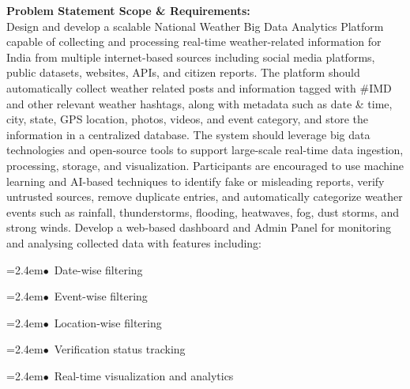 \documentclass[10pt,a4paper]{article}
\begin{document}
\begin{tcolorbox}[pscard, title={"\textbf{SIH26069} \quad $\vert$ \quad National Weather Big Data Analytics Platform}]
\textbf{\color{sihnavy}Problem Statement Scope \& Requirements:}\\[0.15cm]
\noindent\small Design and develop a scalable National Weather Big Data Analytics Platform capable of collecting and processing real-time weather-related information for India from multiple internet-based sources including social media platforms, public datasets, websites, APIs, and citizen reports. The platform should automatically collect weather related posts and information tagged with \#IMD and other relevant weather hashtags, along with metadata such as date \& time, city, state, GPS location, photos, videos, and event category, and store the information in a centralized database. The system should leverage big data technologies and open-source tools to support large-scale real-time data ingestion, processing, storage, and visualization. Participants are encouraged to use machine learning and AI-based techniques to identify fake or misleading reports, verify untrusted sources, remove duplicate entries, and automatically categorize weather events such as rainfall, thunderstorms, flooding, heatwaves, fog, dust storms, and strong winds. Develop a web-based dashboard and Admin Panel for monitoring and analysing collected data with features including:\par\vspace{0.06cm}
\noindent\hspace*{1.2em}\hangindent=2.4em\textcolor{sihblue}{$\bullet$}~\small Date-wise filtering\par\vspace{0.05cm}
\noindent\hspace*{1.2em}\hangindent=2.4em\textcolor{sihblue}{$\bullet$}~\small Event-wise filtering\par\vspace{0.05cm}
\noindent\hspace*{1.2em}\hangindent=2.4em\textcolor{sihblue}{$\bullet$}~\small Location-wise filtering\par\vspace{0.05cm}
\noindent\hspace*{1.2em}\hangindent=2.4em\textcolor{sihblue}{$\bullet$}~\small Verification status tracking\par\vspace{0.05cm}
\noindent\hspace*{1.2em}\hangindent=2.4em\textcolor{sihblue}{$\bullet$}~\small Real-time visualization and analytics\par\vspace{0.05cm}

\end{tcolorbox}
\vspace{0.4cm}
{}
\end{document}
